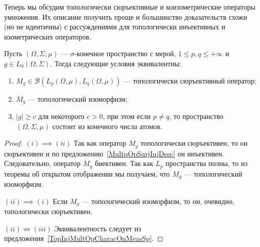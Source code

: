 Теперь мы обсудим топологически сюръективные и коизометрические операторы
умножения. Их описание получить проще и большинство доказательств схожи (но не
идентичны) с рассуждениями для топологически инъективных и изометрических
операторов.

\begin{proposition}\label{TopSurMultOpCharacOnMeasSp} Пусть
$(\Omega,\Sigma,\mu)$ --- $\sigma$-конечное пространство с мерой, 
$1\leq p,q\leq +\infty$ и $g\in L_0(\Omega,\Sigma)$. 
Тогда следующие условия эквивалентны:

\begin{enumerate}[label = (\roman*)]
    \item $M_g\in\mathcal{B}(L_p(\Omega,\mu),L_q(\Omega,\mu))$ --- топологически
    сюръективный оператор;

    \item $M_g$ --- топологический изоморфизм;

    \item $|g|\geq c$ для некоторого $c>0$, при этом если $p\neq q$, то
    пространство $(\Omega,\Sigma,\mu)$ состоит из конечного числа атомов.
\end{enumerate}
\end{proposition}
\begin{proof} $(i) \implies (ii)$ Так как оператор $M_g$ топологически
сюръективен, то он сюръективен и по предложению~\ref{MultpOpSurjInjDesc} он
инъективен. Следовательно, оператор $M_g$ биективен. Так как $L_p$ пространства
полны, то из теоремы об открытом отображении мы получаем, что $M_g$ ---
топологический изоморфизм. 

$(ii) \implies (i)$ Если $M_g$ --- топологический изоморфизм, то он, очевидно,
топологически сюръективен.

$(ii) \Longleftrightarrow (iii)$ Эквивалентность следует из
предложения~\ref{TopInjMultOpCharacOnMeasSp}.
\end{proof}
 
